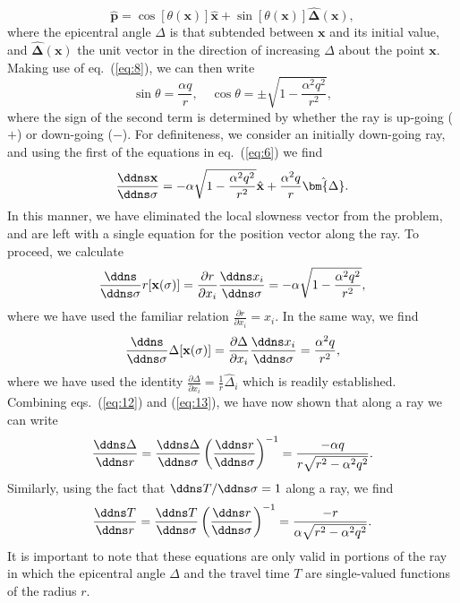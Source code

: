 \begin{equation}
\hat{\mathbf{p}}=\cos[\theta(\mathbf{x})]\hat{\mathbf{x}}+\sin[\theta(\mathbf{x})]\hat{\bm{\Delta}}(\mathbf{x}),
\label{eq:9}
\end{equation}
where the epicentral angle $\Delta$ is that subtended between $\mathbf{x}$ and its initial value, and $\hat{\bm{\Delta}}(\mathbf{x})$ the unit vector in the direction of increasing $\Delta$ about the point $\mathbf{x}$.
Making use of eq.~(\ref{eq:8}), we can then write
\begin{equation}
\sin \theta=\frac{\alpha q}{r},\quad \cos \theta=\pm\sqrt{1-\frac{\alpha^{2}q^{2}}{r^{2}}},
\label{eq:10}
\end{equation}
where the sign of the second term is determined by whether the ray is up-going ($+$) or down-going ($-$). For definiteness, we consider an initially down-going ray, and using the first of the equations in eq.~(\ref{eq:6}) we find
\begin{equation}
\frac{\ddns \mathbf{x}}{\ddns \sigma}=-\alpha\sqrt{1-\frac{\alpha^{2}q^{2}}{r^{2}}}\hat{\mathbf{x}}+\frac{\alpha^{2}q}{r}\hat{\bm{\Delta}}.
\label{eq:11}
\end{equation}
In this manner, we have eliminated the local slowness vector from the problem, and are left with a single equation for the position vector along the ray. To proceed, we calculate
\begin{equation}
\frac{\ddns }{\ddns \sigma}r[\mathbf{x}(\sigma)]=\frac{\partial r}{\partial x_{i}}\frac{\ddns x_{i}}{\ddns\sigma}=-\alpha\sqrt{1-\frac{\alpha^{2}q^{2}}{r^{2}}},
\label{eq:12}
\end{equation}
where we have used the familiar relation $\frac{\partial r}{\partial x_{i}}=\hat{x}_{i}$. In the same way, we find
\begin{equation}
\frac{\ddns }{\ddns \sigma}\Delta[\mathbf{x}(\sigma)]=\frac{\partial\Delta}{\partial x_{i}}\frac{\ddns x_{i}}{\ddns \sigma}=\frac{\alpha^{2}q}{r^{2}},
\label{eq:13}
\end{equation}
where we have used the identity $\frac{\partial\Delta}{\partial x_{i}}=\frac{1}{r}\hat{\Delta}_{i}$ which is readily established. Combining eqs.~(\ref{eq:12}) and (\ref{eq:13}), we have now shown that along a ray we can write
\begin{equation}
\frac{\ddns \Delta}{\ddns r}=\frac{\ddns \Delta}{\ddns\sigma}\left(\frac{\ddns r}{\ddns \sigma}\right)^{-1}=\frac{-\alpha q}{r\sqrt{r^{2}-\alpha^{2}q^{2}}}.
\label{eq:14}
\end{equation}
Similarly, using the fact that $\ddns T/\ddns \sigma=1$ along a ray, we find
\begin{equation}
\frac{\ddns T}{\ddns r}=\frac{\ddns T}{\ddns \sigma}\left(\frac{\ddns r}{\ddns \sigma}\right)^{-1}=\frac{-r}{\alpha\sqrt{r^{2}-\alpha^{2}q^{2}}}.
\label{eq:15}
\end{equation}
It is important to note that these equations are only valid in portions of the ray in which the epicentral angle $\Delta$ and the travel time $T$ are single-valued functions of the radius $r$.

